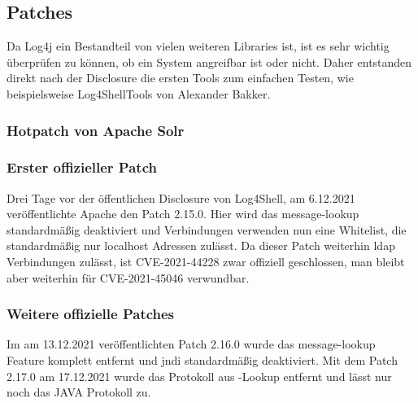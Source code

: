 
\subsection{Patches}\label{subsec:patches}
Da Log4j ein Bestandteil von vielen weiteren Libraries ist, ist es sehr wichtig überprüfen zu können, ob ein System angreifbar ist oder nicht.
Daher entstanden direkt nach der Disclosure die ersten Tools zum einfachen Testen, wie beispielsweise Log4ShellTools von Alexander Bakker.

\subsubsection{Hotpatch von Apache Solr}


\subsubsection{Erster offizieller Patch}
Drei Tage vor der öffentlichen Disclosure von Log4Shell, am 6.12.2021 veröffentlichte Apache den Patch 2.15.0.
Hier wird das message-lookup standardmäßig deaktiviert und  Verbindungen verwenden nun eine Whitelist, die standardmäßig nur localhost Adressen zulässt.
Da dieser Patch weiterhin \gls{ldap} Verbindungen zulässt, ist CVE-2021-44228 zwar offiziell geschlossen, man bleibt aber weiterhin für CVE-2021-45046 verwundbar.

\subsubsection{Weitere offizielle Patches}
Im am 13.12.2021 veröffentlichten Patch 2.16.0 wurde das message-lookup Feature komplett entfernt und \gls{jndi} standardmäßig deaktiviert.
Mit dem Patch 2.17.0 am 17.12.2021 wurde das  Protokoll aus -Lookup entfernt und lässt nur noch das JAVA Protokoll zu.
